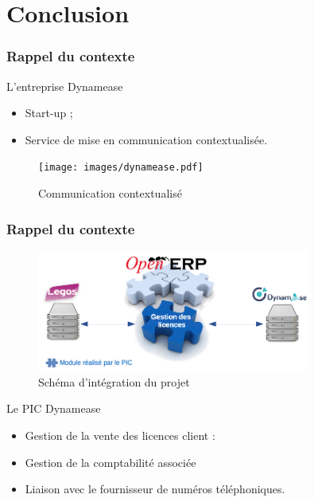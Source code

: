 \section{Conclusion}
\author{Kévin Moreau}


\begin{frame}
	\frametitle{Rappel du contexte}

	\begin{block}{L'entreprise Dynamease}
	 \begin{itemize}
      \item Start-up ;
	  \item Service de mise en communication contextualisée.
	 \end{itemize}
	\end{block}

    \begin{center}
	  \begin{figure}
        \texttt{[image: images/dynamease.pdf]}
	   \caption{Communication contextualisé}
	  \end{figure}
	\end{center}
\end{frame}

\begin{frame}
	\frametitle{Rappel du contexte}
	
	\begin{center}
	  \begin{figure}
	   \includegraphics[width=0.80\textwidth]{images/schemaGlobal.png}
	   \caption{Schéma d'intégration du projet}
	  \end{figure}
	\end{center}

    \begin{block}{Le PIC Dynamease}
	 \begin{itemize}
	  \item Gestion de la vente des licences client :
      \item Gestion de la comptabilité associée
	  \item Liaison avec le fournisseur de numéros téléphoniques.
	 \end{itemize}
	\end{block}

\end{frame}


